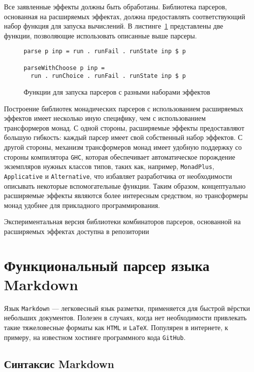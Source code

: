 Все заявленные эффекты должны быть обработаны. Библиотека парсеров, основанная
на расширяемых эффектах, должна предоставлять соответствующий набор функция
для запуска вычислений. В листинге~\ref{listing:ExtEffectsRunners} представлены
две функции, позволяющие использовать описанные выше парсеры.

\begin{figure}[t]
\begin{lstlisting}
parse p inp = run . runFail . runState inp $ p

parseWithChoose p inp =
  run . runChoice . runFail . runState inp $ p
\end{lstlisting}
\caption{Функции для запуска парсеров с разными наборами эффектов}
\label{listing:ExtEffectsRunners}
\end{figure}

Построение библиотек монадических парсеров с использованием расширяемых эффектов
имеет несколько иную специфику, чем с использованием трансформеров монад. С
одной стороны, расширяемые эффекты предоставляют большую гибкость: каждый парсер
имеет свой собственный набор эффектов. С другой стороны, механизм трансформеров
монад имеет удобную поддержку со стороны компилятора \lstinline{GHC}, которая
обеспечивает автоматическое порождение экземпляров нужных классов типов, таких
как, например, \lstinline{MonadPlus}, \lstinline{Applicative} и
\lstinline{Alternative}, что избавляет разработчика от необходимости описывать
некоторые вспомогательные функции. Таким образом, концептуально расширяемые
эффекты являются более интересным средством, но трансформеры монад удобнее для
прикладного программирования.

Экспериментальная версия библиотеки комбинаторов парсеров, основанной на
расширяемых эффектах доступна в репозитории~\cite{extEffParsers} 

\chapter{Функциональный парсер языка Markdown}

Язык \lstinline{Markdown} --- легковесный язык разметки, применяется для быстрой
вёрстки небольших документов. Полезен в случаях, когда нет необходимости привлекать
такие тяжеловесные форматы как \lstinline{HTML} и \lstinline{LaTeX}. Популярен в
интернете, к примеру, на известном хостинге программного кода
\lstinline{GitHub}.

\section{Синтаксис Markdown}

